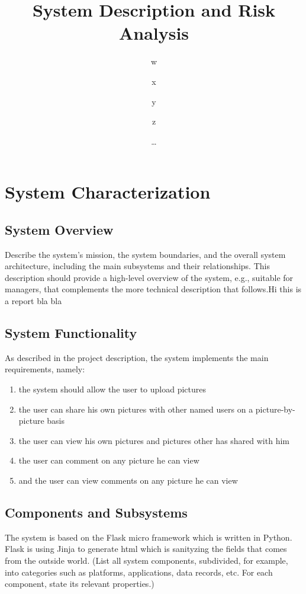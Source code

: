 \documentclass{article}
\title{\huge\sffamily\bfseries System Description and Risk Analysis}
\author{w \and x \and y \and z}
\date{\dots}
\begin{document}
\maketitle


\tableofcontents
\pagebreak


\section{System Characterization}

\subsection{System Overview}

Describe the system's mission,  the system boundaries,
and the overall system architecture, including the main subsystems and
their relationships.   This description should provide a high-level
overview of the system, e.g., suitable for managers, that complements
the more technical description that follows.Hi this is a report
bla bla


\subsection{System Functionality}

As described in the project description, the system implements the main requirements, namely:

\begin{enumerate}
\item the system should allow the user to upload pictures 
\item the user can share his own pictures with other named users on a picture-by-picture basis
\item the user can view his own pictures and pictures other has shared with him
\item the user can comment on any picture he can view
\item and the user can view comments on any picture he can view  
\end{enumerate}


    

\subsection{Components and Subsystems}
The system is based on the Flask micro framework which is written in Python. Flask is using Jinja to generate html which is sanityzing the fields that comes from the outside world. 
(List all system components, subdivided, for example, into
  categories such as platforms, applications, data records, etc. For
  each component, state its relevant properties.)
\end{document}
